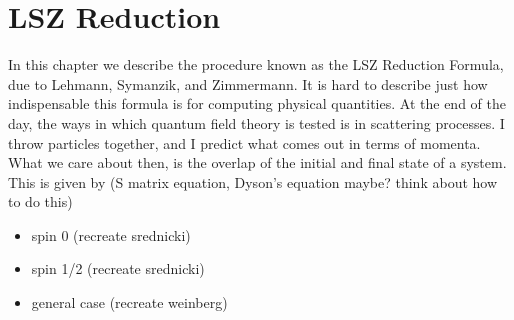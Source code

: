 \documentclass{book}
\begin{document}
\chapter{LSZ Reduction}
In this chapter we describe the procedure known as the LSZ Reduction Formula, due to Lehmann, Symanzik, and Zimmermann. It is hard to describe just how indispensable this formula is for computing physical quantities. At the end of the day, the ways in which quantum field theory is tested is in scattering processes. I throw particles together, and I predict what comes out in terms of momenta. What we care about then, is the overlap of the initial and final state of a system. This is given by (S matrix equation, Dyson's equation maybe? think about how to do this)

\begin{itemize}
\item spin 0 (recreate srednicki)
\item spin 1/2 (recreate srednicki)
\item general case (recreate weinberg)
\end{itemize}
\end{document}
